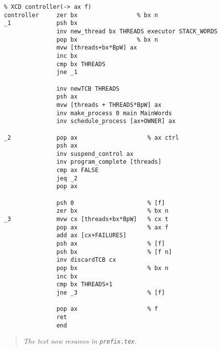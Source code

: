 {\small
\begin{verbatim}
% XCD controller(-> ax f)
controller     zer bx                 % bx n
_1             psh bx
               inv new_thread bx THREADS executor STACK_WORDS
               pop bx                 % bx n
               mvw [threads+bx*BpW] ax
               inc bx
               cmp bx THREADS
               jne _1
               
               inv newTCB THREADS
               psh ax
               mvw [threads + THREADS*BpW] ax
               inv make_process 0 main MainWords
               inv schedule_process [ax+OWNER] ax
               
_2             pop ax                    % ax ctrl
               psh ax
               inv suspend_control ax
               inv program_complete [threads]
               cmp ax FALSE
               jeq _2
               pop ax
               
               psh 0                     % [f]
               zer bx                    % bx n
_3             mvw cx [threads+bx*BpW]   % cx t
               pop ax                    % ax f
               add ax [cx+FAILURES]
               psh ax                    % [f]
               psh bx                    % [f n]
               inv discardTCB cx
               pop bx                    % bx n
               inc bx
               cmp bx THREADS+1
               jne _3                    % [f]
               
               pop ax                    % f
               ret
               end
\end{verbatim}}

\begin{quotation}
\noindent\textsl{The text now resumes in \texttt{prefix.tex}.}
\end{quotation}

